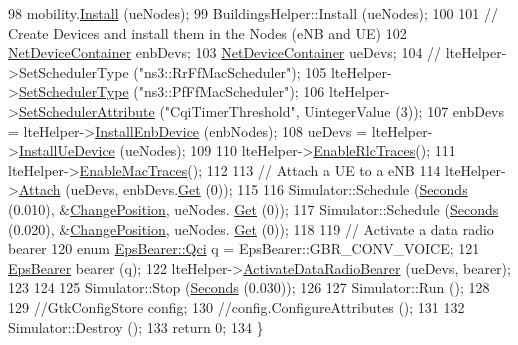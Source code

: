 \begin{DoxyCode}
98   mobility.\hyperlink{classns3_1_1MobilityHelper_a07737960ee95c0777109cf2994dd97ae}{Install} (ueNodes);
99   BuildingsHelper::Install (ueNodes);
100 
101   \textcolor{comment}{// Create Devices and install them in the Nodes (eNB and UE)}
102   \hyperlink{classns3_1_1NetDeviceContainer}{NetDeviceContainer} enbDevs;
103   \hyperlink{classns3_1_1NetDeviceContainer}{NetDeviceContainer} ueDevs;
104 \textcolor{comment}{//   lteHelper->SetSchedulerType ("ns3::RrFfMacScheduler");}
105   lteHelper->\hyperlink{classns3_1_1LteHelper_a8f86e55b8b80a81732c4b2df00fb25d5}{SetSchedulerType} (\textcolor{stringliteral}{"ns3::PfFfMacScheduler"});
106   lteHelper->\hyperlink{classns3_1_1LteHelper_a38f8c7f4592b31c0f3dedb53e7909742}{SetSchedulerAttribute} (\textcolor{stringliteral}{"CqiTimerThreshold"}, UintegerValue (3));
107   enbDevs = lteHelper->\hyperlink{classns3_1_1LteHelper_a5e009ad35ef85f46b5a6099263f15a03}{InstallEnbDevice} (enbNodes);
108   ueDevs = lteHelper->\hyperlink{classns3_1_1LteHelper_ac9cd932d7de92811cfa953c2e3b2fc9f}{InstallUeDevice} (ueNodes);
109   
110   lteHelper->\hyperlink{classns3_1_1LteHelper_abadfdd04d30b261e9b6f0846b4784928}{EnableRlcTraces}();
111   lteHelper->\hyperlink{classns3_1_1LteHelper_affa3a12841520407d3662417fe41863d}{EnableMacTraces}();
112 
113   \textcolor{comment}{// Attach a UE to a eNB}
114   lteHelper->\hyperlink{classns3_1_1LteHelper_a9466743f826aa2652a87907b7f0a1c87}{Attach} (ueDevs, enbDevs.\hyperlink{classns3_1_1NetDeviceContainer_a677d62594b5c9d2dea155cc5045f4d0b}{Get} (0));
115   
116   Simulator::Schedule (\hyperlink{group__timecivil_ga33c34b816f8ff6628e33d5c8e9713b9e}{Seconds} (0.010), &\hyperlink{lena-cqi-threshold_8cc_a788bbe00a65fa13f4e4825f94fae3805}{ChangePosition}, ueNodes.
      \hyperlink{classns3_1_1NodeContainer_a9ed96e2ecc22e0f5a3d4842eb9bf90bf}{Get} (0));
117   Simulator::Schedule (\hyperlink{group__timecivil_ga33c34b816f8ff6628e33d5c8e9713b9e}{Seconds} (0.020), &\hyperlink{lena-cqi-threshold_8cc_a788bbe00a65fa13f4e4825f94fae3805}{ChangePosition}, ueNodes.
      \hyperlink{classns3_1_1NodeContainer_a9ed96e2ecc22e0f5a3d4842eb9bf90bf}{Get} (0));
118 
119   \textcolor{comment}{// Activate a data radio bearer}
120   \textcolor{keyword}{enum} \hyperlink{structns3_1_1EpsBearer_aecf0c67109c5eb4ec0b07226fff5885e}{EpsBearer::Qci} q = EpsBearer::GBR\_CONV\_VOICE;
121   \hyperlink{structns3_1_1EpsBearer}{EpsBearer} bearer (q);
122   lteHelper->\hyperlink{classns3_1_1LteHelper_ac896e16cf162e4beeaa292d39ab1b700}{ActivateDataRadioBearer} (ueDevs, bearer);
123 
124 
125   Simulator::Stop (\hyperlink{group__timecivil_ga33c34b816f8ff6628e33d5c8e9713b9e}{Seconds} (0.030));
126 
127   Simulator::Run ();
128 
129   \textcolor{comment}{//GtkConfigStore config;}
130   \textcolor{comment}{//config.ConfigureAttributes ();}
131 
132   Simulator::Destroy ();
133   \textcolor{keywordflow}{return} 0;
134 \}
\end{DoxyCode}


